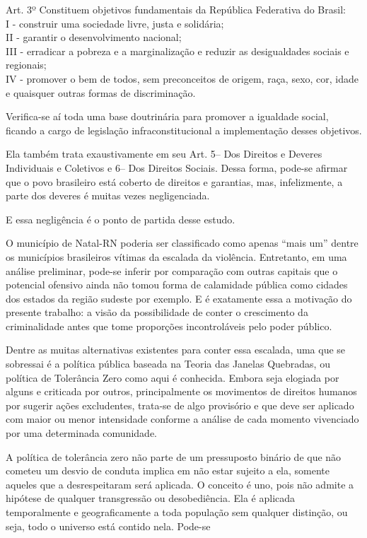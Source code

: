 \documentclass[
	12pt,				%
	openright,			%
	twoside,			%
	a4paper,			%
	chapter=TITLE,		%
	section=TITLE,		%
	subsection=TITLE,	%
	subsubsection=TITLE,%
	spanish,            %
	english,			%
	brazil				%
	]{abntex2}
\begin{document}
\begin{citacao}
	Art. 3º
	Constituem objetivos fundamentais da República Federativa do Brasil:\\
	I - construir uma sociedade livre, justa e solidária;\\
	II - garantir o desenvolvimento nacional;\\
	III - erradicar a pobreza e a marginalização e reduzir as desigualdades sociais e regionais;\\
	IV - promover o bem de todos, sem preconceitos de origem, raça, sexo, cor, idade e quaisquer outras
	formas de discriminação.\cite{CF88}
\end{citacao}
\par
Verifica-se aí toda uma base doutrinária para promover a igualdade social, ficando a cargo de legislação
infraconstitucional a implementação desses objetivos.
\par
Ela também trata exaustivamente em seu Art. 5\textordmasculine -- Dos Direitos e Deveres Individuais e
Coletivos e 6\textordmasculine -- Dos Direitos Sociais. Dessa forma, pode-se afirmar que o povo
brasileiro está coberto de direitos e garantias, mas, infelizmente, a parte dos deveres é muitas vezes
negligenciada.
\par
E essa negligência é o ponto de partida desse estudo.
\par
O município de Natal-RN poderia ser classificado como apenas “mais um” dentre os municípios brasileiros vítimas da escalada da violência. Entretanto, em uma análise preliminar, pode-se inferir por comparação com outras capitais que o potencial ofensivo ainda não tomou
forma de calamidade pública como cidades dos estados da região sudeste por exemplo. E é exatamente essa a motivação do presente trabalho: 
a visão da possibilidade de conter o crescimento da criminalidade antes que tome proporções incontroláveis pelo poder público.
\par
Dentre as muitas alternativas existentes para conter essa escalada, uma que se sobressai é a política pública baseada na Teoria das Janelas Quebradas, ou política de Tolerância Zero como aqui é conhecida. Embora seja elogiada por alguns e criticada por outros, principalmente os
movimentos de direitos humanos por sugerir ações excludentes, trata-se de algo provisório e que deve ser aplicado com maior ou menor
intensidade conforme a análise de cada momento vivenciado por uma determinada comunidade.
\par
A política de tolerância zero não parte de um pressuposto binário de que não cometeu um desvio de conduta implica em não estar sujeito a ela, somente aqueles que a desrespeitaram será aplicada. O conceito é uno, pois não admite a hipótese de qualquer transgressão ou desobediência. Ela é aplicada temporalmente e geograficamente a toda população sem qualquer distinção, ou seja, todo o universo está contido nela. Pode-se
\end{document}
